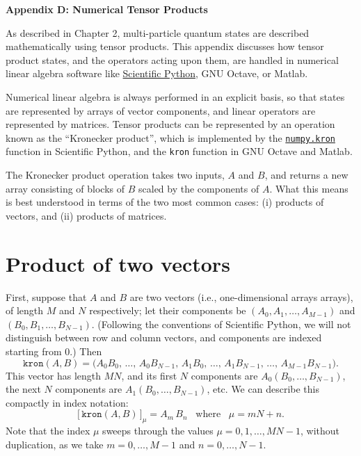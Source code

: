 \documentclass[pra,12pt]{revtex4}
\begin{document}
\begin{center}
{\large \textbf{Appendix D: Numerical Tensor Products}}
\end{center}

As described in Chapter 2, multi-particle quantum states are described
mathematically using tensor products.  This appendix discusses how
tensor product states, and the operators acting upon them, are handled
in numerical linear algebra software like
\href{https://scipy.org/}{Scientific Python}, GNU Octave, or Matlab.

Numerical linear algebra is always performed in an explicit basis, so
that states are represented by arrays of vector components, and linear
operators are represented by matrices.  Tensor products can be
represented by an operation known as the ``Kronecker product'', which
is implemented by the
\href{https://docs.scipy.org/doc/numpy-1.13.0/reference/generated/numpy.kron.html}{\texttt{numpy.kron}}
function in Scientific Python, and the \texttt{kron} function in GNU
Octave and Matlab.

The Kronecker product operation takes two inputs, $A$ and $B$, and
returns a new array consisting of blocks of $B$ scaled by the
components of $A$.  What this means is best understood in terms of the
two most common cases: (i) products of vectors, and (ii) products of
matrices.

\section{Product of two vectors}

First, suppose that $A$ and $B$ are two vectors (i.e.,
one-dimensional arrays arrays), of length $M$ and $N$ respectively;
let their components be $(A_0, A_1, \dots, A_{M-1})$ and $(B_0, B_1,
\dots, B_{N-1})$.  (Following the conventions of Scientific Python, we
will not distinguish between row and column vectors, and components
are indexed starting from 0.)  Then
$$\texttt{kron}(A, B) = \Big(A_0B_0,\,\dots,\, A_0 B_{N-1},\, A_1 B_0,\, \dots,\, A_1 B_{N-1},\, \dots,\, A_{M-1}B_{N-1}\Big).$$
This vector has length $MN$, and its first $N$ components are $A_0
(B_0, \dots,B_{N-1})$, the next $N$ components are $A_1 (B_0, \dots,
B_{N-1})$, etc.  We can describe this compactly in index notation:
$$\big[\, \texttt{kron}(A, B) \,\big]_{\mu} = A_m \, B_n \;\;\;\mathrm{where}\;\;\;\mu = mN+n.$$
Note that the index $\mu$ sweeps through the values $\mu =
0,1,\dots,MN-1$, without duplication, as we take $m = 0,\dots,M-1$ and
$n = 0,\dots,N-1$.
\end{document}

